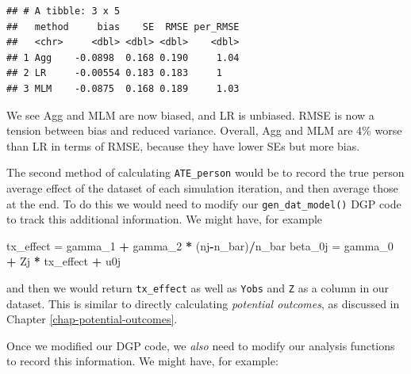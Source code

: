 \documentclass[
]{book}
\newenvironment{Shaded}{\begin{snugshade}}{\end{snugshade}}
\newcommand{\AttributeTok}[1]{\textcolor[rgb]{0.13,0.29,0.53}{#1}}
\newcommand{\ControlFlowTok}[1]{\textcolor[rgb]{0.13,0.29,0.53}{\textbf{#1}}}
\newcommand{\FunctionTok}[1]{\textcolor[rgb]{0.13,0.29,0.53}{\textbf{#1}}}
\newcommand{\NormalTok}[1]{#1}
\newcommand{\OtherTok}[1]{\textcolor[rgb]{0.56,0.35,0.01}{#1}}
\newcommand{\SpecialCharTok}[1]{\textcolor[rgb]{0.81,0.36,0.00}{\textbf{#1}}}
\newcommand{\StringTok}[1]{\textcolor[rgb]{0.31,0.60,0.02}{#1}}
\begin{document}
\begin{verbatim}
## # A tibble: 3 x 5
##   method     bias    SE  RMSE per_RMSE
##   <chr>     <dbl> <dbl> <dbl>    <dbl>
## 1 Agg    -0.0898  0.168 0.190     1.04
## 2 LR     -0.00554 0.183 0.183     1   
## 3 MLM    -0.0875  0.168 0.189     1.03
\end{verbatim}

We see Agg and MLM are now biased, and LR is unbiased.
RMSE is now a tension between bias and reduced variance.
Overall, Agg and MLM are 4\% worse than LR in terms of RMSE, because they have lower SEs but more bias.

The second method of calculating \texttt{ATE\_person} would be to record the true person average effect of the dataset of each simulation iteration, and then average those at the end.
To do this we would need to modify our \texttt{gen\_dat\_model()} DGP code to track this additional information.
We might have, for example

\begin{Shaded}
\begin{Highlighting}[]
\NormalTok{tx\_effect }\OtherTok{=}\NormalTok{ gamma\_1 }\SpecialCharTok{+}\NormalTok{ gamma\_2 }\SpecialCharTok{*}\NormalTok{ (nj}\SpecialCharTok{{-}}\NormalTok{n\_bar)}\SpecialCharTok{/}\NormalTok{n\_bar}
\NormalTok{beta\_0j }\OtherTok{=}\NormalTok{ gamma\_0 }\SpecialCharTok{+}\NormalTok{ Zj }\SpecialCharTok{*}\NormalTok{ tx\_effect }\SpecialCharTok{+}\NormalTok{ u0j}
\end{Highlighting}
\end{Shaded}

and then we would return \texttt{tx\_effect} as well as \texttt{Yobs} and \texttt{Z} as a column in our dataset.
This is similar to directly calculating \emph{potential outcomes}, as discussed in Chapter \ref{chap-potential-outcomes}.

Once we modified our DGP code, we \emph{also} need to modify our analysis functions to record this information.
We might have, for example:

\begin{Shaded}
\end{Shaded}
\end{document}
